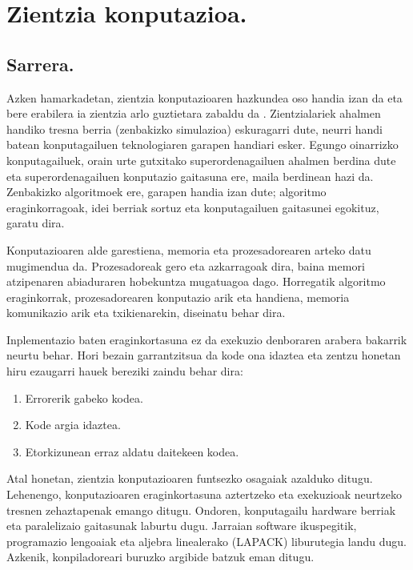 \chapter{Zientzia konputazioa.}


\section{Sarrera.}

Azken hamarkadetan, zientzia konputazioaren hazkundea oso handia izan da eta bere erabilera ia zientzia arlo guztietara zabaldu da \cite{Goedecker2001}. Zientzialariek ahalmen handiko tresna berria (zenbakizko simulazioa) eskuragarri dute, neurri handi batean konputagailuen teknologiaren garapen handiari esker. Egungo oinarrizko konputagailuek, orain urte gutxitako superordenagailuen ahalmen berdina dute eta superordenagailuen konputazio gaitasuna ere, maila berdinean hazi da. Zenbakizko algoritmoek ere, garapen handia izan dute; algoritmo eraginkorragoak, idei berriak sortuz eta konputagailuen gaitasunei egokituz, garatu dira.

Konputazioaren alde garestiena, memoria eta prozesadorearen arteko datu mugimendua da. Prozesadoreak gero eta azkarragoak dira, baina memori atzipenaren abiaduraren hobekuntza mugatuagoa dago. Horregatik algoritmo eraginkorrak, prozesadorearen konputazio arik eta handiena,  memoria komunikazio arik eta txikienarekin, diseinatu behar dira.      
 
Inplementazio baten eraginkortasuna ez da exekuzio denboraren arabera bakarrik neurtu behar. Hori bezain garrantzitsua da kode ona idaztea \cite{Wilson2014} eta zentzu honetan hiru ezaugarri hauek bereziki zaindu behar dira:
\begin{enumerate}
\item Errorerik gabeko kodea.
\item Kode argia idaztea.
\item Etorkizunean erraz aldatu daitekeen kodea.
\end{enumerate}

Atal honetan, zientzia konputazioaren funtsezko osagaiak azalduko ditugu. Lehenengo, konputazioaren eraginkortasuna aztertzeko eta exekuzioak neurtzeko tresnen zehaztapenak emango ditugu. Ondoren, konputagailu hardware berriak eta paralelizaio gaitasunak laburtu dugu. Jarraian software ikuspegitik, programazio lengoaiak eta aljebra linealerako (LAPACK) liburutegia landu dugu. Azkenik, konpiladoreari buruzko argibide batzuk eman ditugu.

